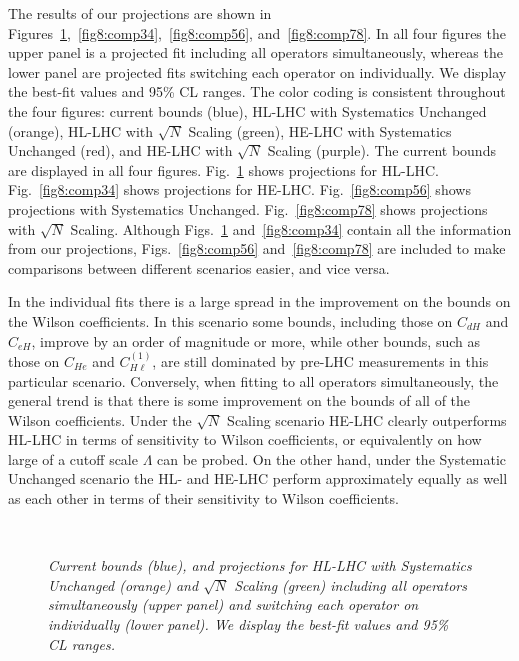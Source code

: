 \documentclass[../report.tex]{subfiles}
\providecommand{\main}{..}
\begin{document}
The results of our projections are shown in Figures~\ref{fig8:comp12},~\ref{fig8:comp34},~\ref{fig8:comp56}, and~\ref{fig8:comp78}.
In all four figures the upper panel is a projected fit including all operators simultaneously, whereas the lower panel are projected fits switching each operator on individually.
We display the best-fit values and 95\% CL ranges.
The color coding is consistent throughout the four figures: current bounds (blue), HL-LHC with Systematics Unchanged (orange), HL-LHC with $\sqrt{N}$ Scaling (green), HE-LHC with Systematics Unchanged (red), and HE-LHC with $\sqrt{N}$ Scaling (purple).
The current bounds are displayed in all four figures.
Fig.~\ref{fig8:comp12} shows projections for HL-LHC.
Fig.~\ref{fig8:comp34} shows projections for HE-LHC.
Fig.~\ref{fig8:comp56} shows projections with Systematics Unchanged.
Fig.~\ref{fig8:comp78} shows projections with $\sqrt{N}$ Scaling.
Although Figs.~\ref{fig8:comp12} and~\ref{fig8:comp34} contain all the information from our projections, Figs.~\ref{fig8:comp56} and~\ref{fig8:comp78} are included to make comparisons between different scenarios easier, and vice versa.

In the individual fits there is a large spread in the improvement on the bounds on the Wilson coefficients.
In this scenario some bounds, including those on $C_{dH}$ and $C_{eH}$, improve by an order of magnitude or more, while other bounds, such as those on $C_{He}$ and $C_{H\ell}^{(1)}$, are still dominated by pre-LHC measurements in this particular scenario.
Conversely, when fitting to all operators simultaneously, the general trend is that there is some improvement on the bounds of all of the Wilson coefficients.
Under the $\sqrt{N}$ Scaling scenario HE-LHC clearly outperforms HL-LHC in terms of sensitivity to Wilson coefficients, or equivalently on how large of a cutoff scale $\Lambda$ can be probed.
On the other hand, under the Systematic Unchanged scenario the HL- and HE-LHC perform approximately equally as well as each other in terms of their sensitivity to Wilson coefficients.

\begin{figure}[h]
  \centering
    \\
 \caption{\it Current bounds (blue), and projections for HL-LHC with Systematics Unchanged (orange) and $\sqrt{N}$ Scaling (green) including all operators simultaneously (upper panel) and switching each operator on individually (lower panel). We display the best-fit values and 95\% CL ranges.}
   \label{fig8:comp12}
\end{figure} 
\end{document}
